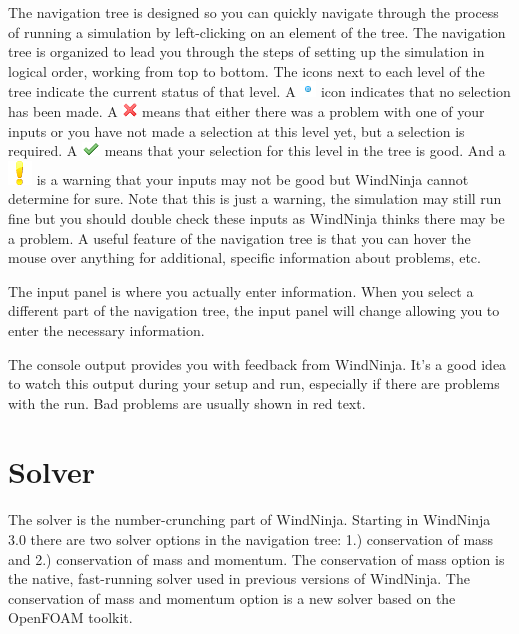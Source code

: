\documentclass[12pt]{article}
\begin{document}
The navigation tree is designed so you can quickly navigate through the process of running a simulation by left-clicking on an element of the tree.  The navigation tree is organized to lead you through the steps of setting up the simulation in logical order, working from top to bottom.  The icons next to each level of the tree indicate the current status of that level.  A \includegraphics[scale=0.75]{blue_dot} icon indicates that no selection has been made.  A \includegraphics[scale=0.75]{red_cross}  means that either there was a problem with one of your inputs or you have not made a selection at this level yet, but a selection is required.  A \includegraphics[scale=0.75]{green_check}  means that your selection for this level in the tree is good.  And a \includegraphics[scale=0.5]{ftfo} is a warning that your inputs may not be good but WindNinja cannot determine for sure.  Note that this is just a warning, the simulation may still run fine but you should double check these inputs as WindNinja thinks there may be a problem.  A useful feature of the navigation tree is that you can hover the mouse over anything for additional, specific information about problems, etc.

The input panel is where you actually enter information.  When you select a different part of the navigation tree, the input panel will change allowing you to enter the necessary information.

The console output provides you with feedback from WindNinja.  It’s a good idea to watch this output during your setup and run, especially if there are problems with the run.  Bad problems are usually shown in red text.

\section{Solver}
The solver is the number-crunching part of WindNinja. Starting in WindNinja 3.0 there are two solver options in the navigation tree: 1.) conservation of mass and 2.) conservation of mass and momentum. The conservation of mass option is the native, fast-running solver used in previous versions of WindNinja. The conservation of mass and momentum option is a new solver based on the OpenFOAM toolkit. 
\end{document}
